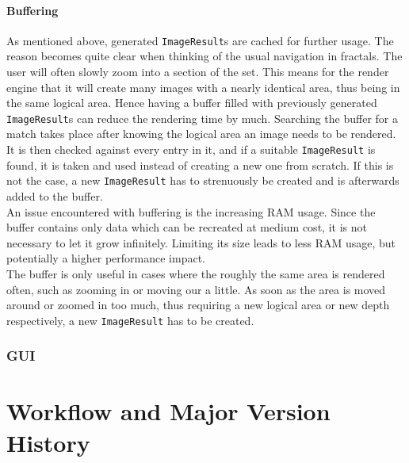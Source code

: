 \documentclass[10pt,a4paper,titlepage]{article}
\begin{document}
	\paragraph{Buffering} \label{par:paragraph_image_creation_buffering}
	As mentioned above, generated \verb|ImageResult|s are cached for further usage. The reason becomes quite clear when thinking of the usual navigation in fractals. The user will often slowly zoom into a section of the set. This means for the render engine that it will create many images with a nearly identical area, thus being in the same logical area. Hence having a buffer filled with previously generated \verb|ImageResult|s can reduce the rendering time by much. Searching the buffer for a match takes place after knowing the logical area an image needs to be rendered. It is then checked against every entry in it, and if a suitable \verb|ImageResult| is found, it is taken and used instead of creating a new one from scratch. If this is not the case, a new \verb|ImageResult| has to strenuously be created and is afterwards added to the buffer.\\
	An issue encountered with buffering is the increasing RAM usage. Since the buffer contains only data which can be recreated at medium cost, it is not necessary to let it grow infinitely. Limiting its size leads to less RAM usage, but potentially a higher performance impact.\\ The buffer is only useful in cases where the roughly the same area is rendered often, such as zooming in or moving our a little. As soon as the area is moved around or zoomed in too much, thus requiring a new logical area or new depth respectively, a new \verb|ImageResult| has to be created.
	\subsubsection{GUI}
	\section{Workflow and Major Version History}
	
	\clearpage
	\appendix
	\printbibliography
\end{document}
